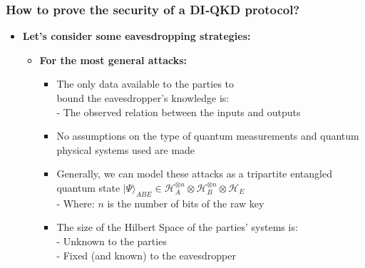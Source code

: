 \documentclass{beamer}
\begin{document}
    \begin{frame}
        \frametitle{\large How to prove the security of a DI‑QKD protocol?}

        \vspace{3ex}
        \begin{itemize}
            \item \textbf{Let's consider some eavesdropping strategies:}
            \begin{itemize}
                \item \textbf{For the most general attacks:}
                \begin{itemize}
                    \small
                    \item The only data available to the parties to\\ bound the eavesdropper's knowledge is:\\
                    \footnotesize
                    - The observed relation between the inputs and outputs
                    \vspace{1ex}
                    \small
                    \item No assumptions on the type of quantum measurements and quantum physical systems used are made
                    \vspace{2ex}
                    \small
                    \item Generally, we can model these attacks as a tripartite entangled quantum state ${|\Psi\rangle}_{ABE} \in {\mathcal{H}}_{A}^{\otimes n} \otimes {\mathcal{H}}_{B}^{\otimes n} \otimes {\mathcal{H}}_{E}$\\
                    \vspace{0.75ex}
                    \footnotesize
                    - Where: $n$ is the number of bits of the raw key
                    \vspace{2ex}
                    \small
                    \item The size of the Hilbert Space of the parties' systems is:\\
                    \footnotesize
                    - Unknown to the parties\\
                    - Fixed (and known) to the eavesdropper
                \end{itemize}
            \end{itemize}
        \end{itemize}
    \end{frame}
\end{document}
